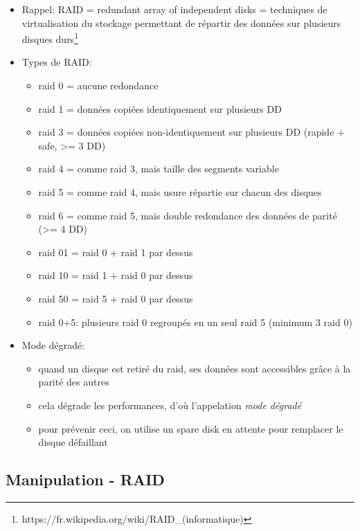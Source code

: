\documentclass[a4paper]{article}
\begin{document}
\begin{itemize}

\item Rappel: RAID = redundant array of independent disks = techniques de virtualisation du stockage permettant de répartir des données sur plusieurs disques durs\footnote{https://fr.wikipedia.org/wiki/RAID\_(informatique)}

\item Types de RAID:
\begin{itemize}
    \item raid 0 = aucune redondance
    \item raid 1 = données copiées identiquement sur plusieurs DD
    \item raid 3 = données copiées non-identiquement sur plusieurs DD (rapide + safe, >= 3 DD)
    \item raid 4 = comme raid 3, mais taille des segments variable
    \item raid 5 = comme raid 4, mais usure répartie sur chacun des disques
    \item raid 6 = comme raid 5, mais double redondance des données de parité (>= 4 DD)
    \item raid 01 = raid 0 + raid 1 par dessus
    \item raid 10 = raid 1 + raid 0 par dessus
    \item raid 50 = raid 5 + raid 0 par dessus
    \item raid 0+5: plusieurs raid 0 regroupés en un seul raid 5 (minimum 3 raid 0)
\end{itemize}

\item Mode dégradé:
\begin{itemize}
    \item quand un disque est retiré du raid, ses données sont accessibles grâce à la parité des autres
    \item cela dégrade les performances, d'où l'appelation \textit{mode dégradé}
    \item pour prévenir ceci, on utilise un spare disk en attente pour remplacer le disque défaillant
\end{itemize}

\end{itemize}










\subsection{Manipulation - RAID}
\end{document}
